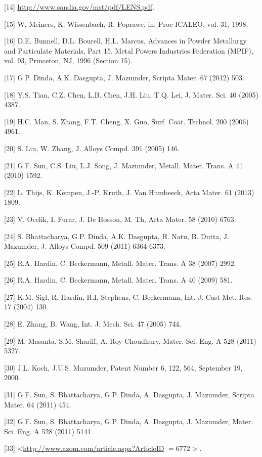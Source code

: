\documentclass[10pt]{article}
\begin{document}
[14] \href{http://www.sandia.gov/mst/pdf/LENS.pdf}{http://www.sandia.gov/mst/pdf/LENS.pdf}.

[15] W. Meiners, K. Wissenbach, R. Poprawe, in: Proc ICALEO, vol. 31, 1998.

[16] D.E. Bunnell, D.L. Bourell, H.L. Marcus, Advances in Powder Metallurgy and Particulate Materials, Part 15, Metal Powers Industries Federation (MPIF), vol. 93, Princeton, NJ, 1996 (Section 15).

[17] G.P. Dinda, A.K. Dasgupta, J. Mazumder, Scripta Mater. 67 (2012) 503.

[18] Y.S. Tian, C.Z. Chen, L.B. Chen, J.H. Liu, T.Q. Lei, J. Mater. Sci. 40 (2005) 4387.

[19] H.C. Man, S. Zhang, F.T. Cheng, X. Guo, Surf. Coat. Technol. 200 (2006) 4961.

[20] S. Liu, W. Zhang, J. Alloys Compd. 391 (2005) 146.

[21] G.F. Sun, C.S. Liu, L.J. Song, J. Mazumder, Metall. Mater. Trans. A 41 (2010) 1592.

[22] L. Thijs, K. Kempen, J.-P. Kruth, J. Van Humbeeck, Acta Mater. 61 (2013) 1809.

[23] V. Ocelik, I. Furar, J. De Hosson, M. Th, Acta Mater. 58 (2010) 6763.

[24] S. Bhattacharya, G.P. Dinda, A.K. Dasgupta, H. Natu, B. Dutta, J. Mazumder, J. Alloys Compd. 509 (2011) 6364-6373.

[25] R.A. Hardin, C. Beckermann, Metall. Mater. Trans. A 38 (2007) 2992.

[26] R.A. Hardin, C. Beckermann, Metall. Mater. Trans. A 40 (2009) 581.

[27] K.M. Sigl, R. Hardin, R.I. Stephens, C. Beckermann, Int. J. Cast Met. Res. 17 (2004) 130.

[28] E. Zhang, B. Wang, Int. J. Mech. Sci. 47 (2005) 744.

[29] M. Masanta, S.M. Shariff, A. Roy Choudhury, Mater. Sci. Eng. A 528 (2011) 5327.

[30] J.L. Koch, J.U.S. Mazumder, Patent Number 6, 122, 564, September 19, 2000.

[31] G.F. Sun, S. Bhattacharya, G.P. Dinda, A. Dasgupta, J. Mazumder, Scripta Mater. 64 (2011) 454.

[32] G.F. Sun, S. Bhattacharya, G.P. Dinda, A. Dasgupta, J. Mazumder, Mater. Sci. Eng. A 528 (2011) 5141.

[33] <\href{http://www.azom.com/article.aspx?ArticleID}{http://www.azom.com/article.aspx?ArticleID} $=6772>$.
\end{document}
